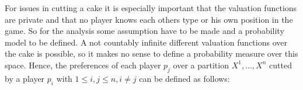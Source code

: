 For issues in cutting a cake it is especially important that the valuation functions are private and that no player knows each others type or his own position in the game. So for the analysis some assumption have to be made and a probability model to be defined. A not countably infinite different valuation functions over the cake is possible, so it makes no sense to define a probability measure over this space. Hence, the preferences of each player $p_j$ over a partition $X^1, \ldots, X^n$ cutted by a player $p_i$ with $1 \leq i,j \leq n, i \neq j$ can be defined as follows:    
